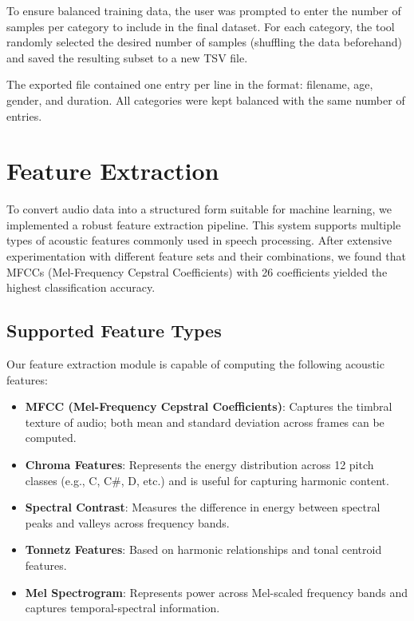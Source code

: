 \documentclass[a4paper,12pt]{article}
\begin{document}
To ensure balanced training data, the user was prompted to enter the number of samples per category to include in the final dataset. For each category, the tool randomly selected the desired number of samples (shuffling the data beforehand) and saved the resulting subset to a new TSV file.

The exported file contained one entry per line in the format: filename, age, gender, and duration. All categories were kept balanced with the same number of entries.

\newpage
\section{Feature Extraction}
\label{sec:feature-extraction}

To convert audio data into a structured form suitable for machine learning, we implemented a robust feature extraction pipeline. This system supports multiple types of acoustic features commonly used in speech processing. After extensive experimentation with different feature sets and their combinations, we found that MFCCs (Mel-Frequency Cepstral Coefficients) with 26 coefficients yielded the highest classification accuracy.

\subsection*{Supported Feature Types}

Our feature extraction module is capable of computing the following acoustic features:

\begin{itemize}
    \item \textbf{MFCC (Mel-Frequency Cepstral Coefficients)}: Captures the timbral texture of audio; both mean and standard deviation across frames can be computed.
    \item \textbf{Chroma Features}: Represents the energy distribution across 12 pitch classes (e.g., C, C\#, D, etc.) and is useful for capturing harmonic content.
    \item \textbf{Spectral Contrast}: Measures the difference in energy between spectral peaks and valleys across frequency bands.
    \item \textbf{Tonnetz Features}: Based on harmonic relationships and tonal centroid features.
    \item \textbf{Mel Spectrogram}: Represents power across Mel-scaled frequency bands and captures temporal-spectral information.
\end{itemize}
\end{document}

